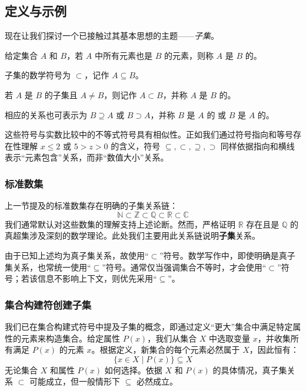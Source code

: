 \subsection{定义与示例}

现在让我们探讨一个已接触过其基本思想的主题——\emph{子集}。

\begin{definition}
    给定集合 $A$ 和 $B$，若 $A$ 中所有元素也是 $B$ 的元素，则称 $A$ 是 $B$ 的。

    子集的数学符号为 $\subset$，记作 $A \subseteq B$。

    若 $A$ 是 $B$ 的子集且 $A \neq B$，则记作 $A \subset B$，并称 $A$ 是 $B$ 的。

    相应的关系也可表示为 $B \supseteq A$ 或 $B \supset A$，并称 $B$ 是 $A$ 的 或 $B$ 是 $A$ 的。
\end{definition}

这些符号与实数比较中的不等式符号具有相似性。正如我们通过符号指向和等号存在性理解 $x \le 2$ 或 $5 > z > 0$ 的含义，符号 $\subseteq, \subset, \supseteq, \supset$ 同样依据指向和横线表示``元素包含''关系，而非``数值大小''关系。

\subsubsection*{标准数集}

上一节提及的标准数集存在明确的子集关系链：
\[\mathbb{N} \subset \mathbb{Z} \subset \mathbb{Q} \subset \mathbb{R} \subset \mathbb{C}\]
我们通常默认对这些数集的理解支持上述论断。然而，严格证明 $\mathbb{R}$ 存在且是 $\mathbb{Q}$ 的真超集涉及深刻的数学理论。此处我们主要用此关系链说明\textbf{子集}关系。

由于已知上述均为真子集关系，故使用``$\subset$''符号。数学写作中，即使明确是真子集关系，也常统一使用``$\subseteq$''符号。通常仅当强调集合不等时，才会使用``$\subset$''符号；若该信息不影响上下文，则优先采用``$\subseteq$''。

\subsubsection*{集合构建符创建子集}

我们已在集合构建式符号中提及子集的概念，即通过定义``更大''集合中满足特定属性的元素来构造集合。给定属性 $P(x)$，我们从集合 $X$ 中选取变量 $x$，并收集所有满足 $P(x)$ 的元素 $x$。根据定义，新集合的每个元素必然属于 $X$，因此恒有：
\[\{x \in X \mid P(x)\} \subseteq X\]
无论集合 $X$ 和属性 $P(x)$ 如何选择。依据 $X$ 和 $P(x)$ 的具体情况，真子集关系 $\subset$ 可能成立，但一般情形下 $\subseteq$ 必然成立。

